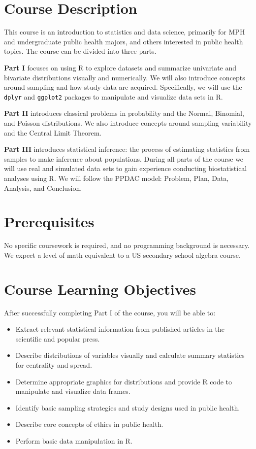 \documentclass[11pt]{article}
\begin{document}
\section*{Course Description}

This course is an introduction to statistics and data science, primarily for
MPH and undergraduate public health majors, and others interested in public
health topics. The course can be divided into three parts.

\textbf{Part I} focuses on using R to explore datasets and summarize univariate
and bivariate distributions visually and numerically. We will also introduce
concepts around sampling and how study data are acquired. Specifically, we will
use the \texttt{dplyr} and \texttt{ggplot2} packages to manipulate and visualize
data sets in R.

\textbf{Part II} introduces classical problems in probability and the Normal,
Binomial, and Poisson distributions. We also introduce concepts around sampling
variability and the Central Limit Theorem.

\textbf{Part III} introduces statistical inference: the process of estimating
statistics from samples to make inference about populations. During all parts
of the course we will use real and simulated data sets to gain experience
conducting biostatistical analyses using R. We will follow the PPDAC model:
Problem, Plan, Data, Analysis, and Conclusion.

\section*{Prerequisites}

No specific coursework is required, and no programming background is necessary.
We expect a level of math equivalent to a US secondary school algebra course.

\section*{Course Learning Objectives}

After successfully completing Part I of the course, you will be able to:
\begin{itemize}
  \item Extract relevant statistical information from published articles in the scientific and popular press.
  \item Describe distributions of variables visually and calculate summary statistics for centrality and spread.
  \item Determine appropriate graphics for distributions and provide R code to manipulate and visualize data frames.
  \item Identify basic sampling strategies and study designs used in public health.
  \item Describe core concepts of ethics in public health.
  \item Perform basic data manipulation in R.
\end{itemize}
\end{document}
